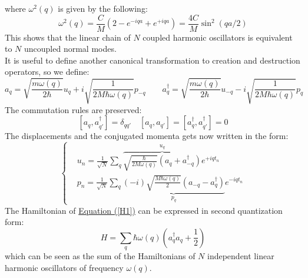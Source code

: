 \documentclass[10.75pt,a4paper,openright,bottom=2cm]{article}
\begin{document}
where $\omega^2(q)$ is given by the following:
\[
\omega^2(q)=\frac{C}{M}(2-e^{-iqa}+e^{+iqa})=\frac{4C}{M}\sin^2(qa/2)
\]
This shows that the linear chain of $N$ coupled harmonic oscillators is equivalent to $N$ uncoupled normal modes.\\
It is useful to define another canonical transformation to creation and destruction operators, so we define:
\[
a_q=\sqrt{\frac{m\omega(q)}{2\hbar}}u_q+i\sqrt{\frac{1}{2M\hbar\omega(q)}}p_{-q} \qquad a_q^\dagger=\sqrt{\frac{m\omega(q)}{2\hbar}}u_{-q}-i\sqrt{\frac{1}{2M\hbar\omega(q)}}p_q
\]
The commutation rules are preserved:
\[
[a_q,a_{q'}^\dagger]=\delta_{qq'} \quad [a_q,a_{q'}]=[a_q^\dagger,a_{q'}^\dagger]=0
\]
The displacements and the conjugated momenta gets now written in the form:
\[
\left\{
\begin{aligned}
&u_n=\frac{1}{\sqrt{N}}\sum_q\overbrace{\sqrt{\frac{\hbar}{2M\omega(q)}}(a_q+a_{-q}^\dagger)}^{u_q}e^{+iqt_n}\\
&p_n=\frac{1}{\sqrt{N}}\sum_q\underbrace{(-i)\sqrt{\frac{M\hbar\omega(q)}{2}}(a_{-q}-a_q^\dagger)}_{p_q}e^{-iqt_n}
\end{aligned}
\right.
\]
The Hamiltonian of \hyperref[H1]{Equation (\ref{H1})} can be expressed in second quantization form:
\[
H=\sum_q\hbar\omega(q)\left(a_q^\dagger a_q+\frac{1}{2}\right)
\]
which can be seen as the sum of the Hamiltonians of $N$ independent linear harmonic oscillators of frequency $\omega(q)$.
\end{document}
